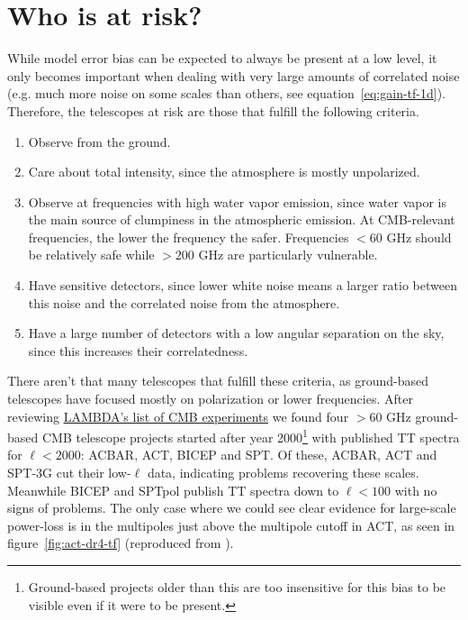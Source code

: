 \documentclass[twocolumn,apj]{aastex63}
\begin{document}
\section{Who is at risk?}
While model error bias can be expected to always be present at a
low level, it only becomes important when dealing with very large amounts
of correlated noise (e.g. much more noise on some scales than others,
see equation~\ref{eq:gain-tf-1d}). Therefore, the telescopes at risk are
those that fulfill the following criteria.
\begin{enumerate}
	\item Observe from the ground.
	\item Care about total intensity, since the atmosphere is mostly unpolarized.
	\item Observe at frequencies with high water vapor emission, since
		water vapor is the main source of clumpiness in the atmospheric emission.
		At CMB-relevant frequencies, the lower the frequency the safer.
		Frequencies $<60$ GHz should be relatively safe while $>200$ GHz are
		particularly vulnerable.
	\item Have sensitive detectors, since lower white noise means a larger
		ratio between this noise and the correlated noise from the atmosphere.
	\item Have a large number of detectors with a low angular separation on
		the sky, since this increases their correlatedness.
\end{enumerate}
There aren't that many telescopes that fulfill these criteria, as ground-based
telescopes have focused mostly on polarization or lower frequencies. After reviewing
\href{https://lambda.gsfc.nasa.gov/product/expt}{LAMBDA's list of CMB experiments}
we found four $>60$ GHz ground-based CMB telescope projects started after year 2000\footnote{
	Ground-based projects older than this are too insensitive for this bias to be visible even if
	it were to be present.}
with published TT spectra for $\ell < 2000$: ACBAR, ACT, BICEP and SPT. Of these,
ACBAR, ACT \citep{choi/etal:2020} and SPT-3G \citep{spt3g-ps-2022} cut their low-$\ell$ data, indicating problems recovering
these scales. Meanwhile BICEP \citep{barkats/etal/2013, bicep-keck-ps-2018} and SPTpol \citep{sptpol-ps-2018} publish TT spectra down to $\ell < 100$ with
no signs of problems. The only case where we could see clear evidence for large-scale
power-loss is in the multipoles just above the multipole cutoff in ACT, as seen in
figure~\ref{fig:act-dr4-tf} (reproduced from \citet{choi/etal:2020}).
\end{document}
